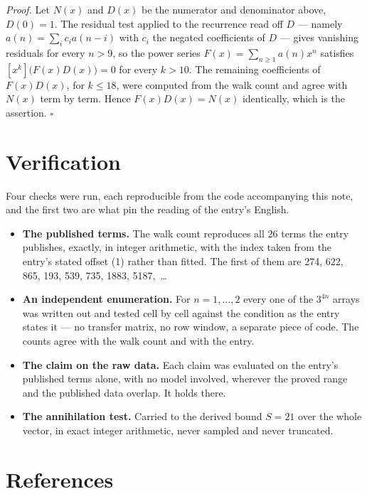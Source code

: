 \documentclass[11pt]{article}
\theoremstyle{definition}
\begin{document}
{\itshape Proof.} Let $N(x)$ and $D(x)$ be the numerator and denominator above, $D(0)=1$. The residual test applied to the recurrence read off $D$ --- namely $a(n) = \sum_i c_i a(n-i)$ with $c_i$ the negated coefficients of $D$ --- gives vanishing residuals for every $n > 9$, so the power series $F(x)=\sum_{n\ge 1}a(n)x^n$ satisfies $[x^k]\bigl(F(x)D(x)\bigr) = 0$ for every $k > 10$. The remaining coefficients of $F(x)D(x)$, for $k \le 18$, were computed from the walk count and agree with $N(x)$ term by term. Hence $F(x)D(x) = N(x)$ identically, which is the assertion. $\square$

\section{Verification}

Four checks were run, each reproducible from the code accompanying this note, and the first two are what pin the reading of the entry's English.

\begin{itemize}

\item {\bfseries The published terms.} The walk count reproduces all 26 terms the entry publishes, exactly, in integer arithmetic, with the index taken from the entry's stated offset (1) rather than fitted. The first of them are 274, 622, 865, 193, 539, 735, 1883, 5187,~\dots

\item {\bfseries An independent enumeration.} For $n = 1,\dots,2$ every one of the $3^{4n}$ arrays was written out and tested cell by cell against the condition as the entry states it --- no transfer matrix, no row window, a separate piece of code. The counts agree with the walk count and with the entry.

\item {\bfseries The claim on the raw data.} Each claim was evaluated on the entry's published terms alone, with no model involved, wherever the proved range and the published data overlap. It holds there.

\item {\bfseries The annihilation test.} Carried to the derived bound $S = 21$ over the whole vector, in exact integer arithmetic, never sampled and never truncated.

\end{itemize}

\section{References}
\end{document}
